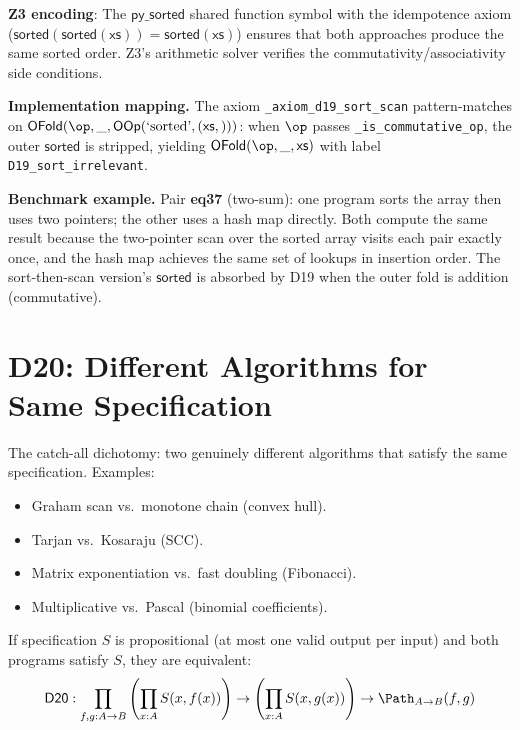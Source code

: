 \textbf{Z3 encoding}: The $\mathsf{py\_sorted}$ shared function
symbol with the idempotence axiom ($\mathsf{sorted}(\mathsf{sorted}
(\mathsf{xs})) = \mathsf{sorted}(\mathsf{xs})$) ensures that both
approaches produce the same sorted order.  Z3's arithmetic solver
verifies the commutativity/associativity side conditions.

\textbf{Implementation mapping.}
The axiom \texttt{\_axiom\_d19\_sort\_scan} pattern-matches on
$\mathsf{OFold}(\op, \_, \mathsf{OOp}(\text{`sorted'}, (\mathsf{xs},)))$:
when $\op$ passes \texttt{\_is\_commutative\_op}, the outer
$\mathsf{sorted}$ is stripped, yielding
$\mathsf{OFold}(\op, \_, \mathsf{xs})$ with label
\texttt{D19\_sort\_irrelevant}.

\textbf{Benchmark example.}
Pair \textbf{eq37} (two-sum): one program sorts the array then uses
two pointers; the other uses a hash map directly.  Both compute the
same result because the two-pointer scan over the sorted array visits
each pair exactly once, and the hash map achieves the same set of
lookups in insertion order.  The sort-then-scan version's
$\mathsf{sorted}$ is absorbed by D19 when the outer fold is
addition (commutative).

\section{D20: Different Algorithms for Same Specification}
\label{sec:d20-spec}

The catch-all dichotomy: two genuinely different algorithms that
satisfy the same specification.  Examples:
\begin{itemize}
  \item Graham scan vs.\ monotone chain (convex hull).
  \item Tarjan vs.\ Kosaraju (SCC).
  \item Matrix exponentiation vs.\ fast doubling (Fibonacci).
  \item Multiplicative vs.\ Pascal (binomial coefficients).
\end{itemize}

\begin{theorem}
\label{thm:d20-spec}
If specification $S$ is propositional (at most one valid output per
input) and both programs satisfy $S$, they are equivalent:
\[
  \mathsf{D20} : \prod_{f,g : A \to B}
  \left(\prod_{x:A} S(x, f(x))\right) \to
  \left(\prod_{x:A} S(x, g(x))\right) \to
  \Path_{A \to B}(f, g)
\]
\end{theorem}

